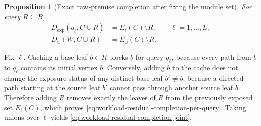 \documentclass[journal]{IEEEtran}
\makeatletter
\newtheorem{proposition}{Proposition}[section]
\numberwithin{equation}{section}
\renewenvironment{proof}[1][\proofname]{\par
  \pushQED{\qed}%
  \normalfont \topsep6\p@\@plus6\p@\relax
  \trivlist
  \item[\hskip\labelsep
        \itshape
    #1\@addpunct{.}]\ignorespaces
}{%
  \popQED\endtrivlist\@endpefalse
}
\makeatother
\begin{document}
\begin{proposition}[Exact raw-premise completion after fixing the module set]
\label{prop:workload-residual-completion}
For every \(R\subseteq B\),
\begin{align}
  D_{\mathrm{exp}}(q_\ell,C\cup R)
  &=
  E_\ell(C)\setminus R,
  \qquad \ell=1,\ldots,L,
\label{eq:workload-residual-completion-per-query}\\
  D_{\cup}(W,C\cup R)
  &=
  E_{\cup}(C)\setminus R.
\label{eq:workload-residual-completion-joint}
\end{align}
\end{proposition}

\begin{proof}
Fix \(\ell\).  Caching a base leaf \(b\in R\) blocks \(b\) for query \(q_\ell\),
because every path from \(b\) to \(q_\ell\) contains its initial vertex \(b\).
Conversely, adding \(b\) to the cache does not change the exposure status of
any distinct base leaf \(b'\neq b\), because a directed path starting at the
source leaf \(b'\) cannot pass through another source leaf \(b\).  Therefore
adding \(R\) removes exactly the leaves of \(R\) from the previously exposed
set \(E_\ell(C)\), which proves
\eqref{eq:workload-residual-completion-per-query}.  Taking unions over
\(\ell\) yields \eqref{eq:workload-residual-completion-joint}.
\end{proof}
\end{document}
